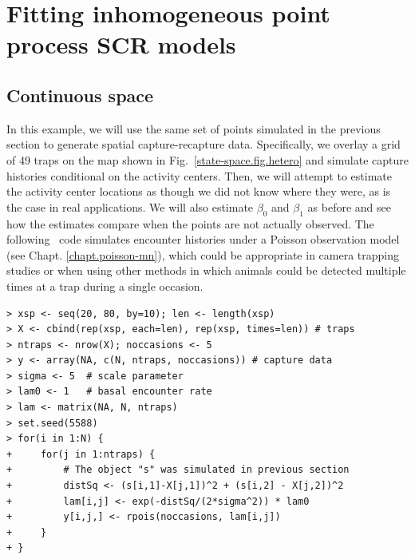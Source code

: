 \section{Fitting inhomogeneous point process SCR models}

\subsection{Continuous space}



In this example, we will use the same set of points simulated in the
previous section to generate spatial capture-recapture
data. Specifically, we overlay a grid of 49
traps on the map shown in Fig.~\ref{state-space.fig.hetero} and
simulate capture histories conditional on the activity
centers. Then, we will attempt to estimate the activity center
locations as though we did not know where they were, as is the case in
real applications. We will also estimate $\beta_0$ and $\beta_1$ as
before and see how the estimates compare when the points are not
actually observed. The following \R~code simulates encounter histories under a
Poisson observation model (see Chapt. \ref{chapt.poisson-mn}), which could be appropriate in camera
trapping studies or when using other methods in which animals could
be detected multiple times at a trap during a single occasion.
\begin{small}
\begin{verbatim}
> xsp <- seq(20, 80, by=10); len <- length(xsp)
> X <- cbind(rep(xsp, each=len), rep(xsp, times=len)) # traps
> ntraps <- nrow(X); noccasions <- 5
> y <- array(NA, c(N, ntraps, noccasions)) # capture data
> sigma <- 5  # scale parameter
> lam0 <- 1   # basal encounter rate
> lam <- matrix(NA, N, ntraps)
> set.seed(5588)
> for(i in 1:N) {
+     for(j in 1:ntraps) {
+         # The object "s" was simulated in previous section
+         distSq <- (s[i,1]-X[j,1])^2 + (s[i,2] - X[j,2])^2
+         lam[i,j] <- exp(-distSq/(2*sigma^2)) * lam0
+         y[i,j,] <- rpois(noccasions, lam[i,j])
+     }
+ }
\end{verbatim}
\end{small}

